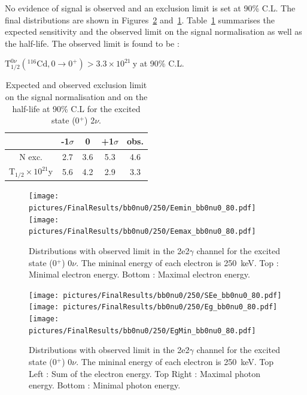 \documentclass[main.tex]{subfiles}
\begin{document}
\NI No evidence of signal is observed and an exclusion limit is set at 90\% C.L. The final distributions are shown in Figures~\ref{plot:SEeAndEg250bb0nu0} and~\ref{plot:EeminAndEemax250bb0nu0}. Table~\ref{Tab:FinalResultsbb0nu0} summarises the expected sensitivity and the observed limit on the signal normalisation as well as the half-life. The observed limit is found to be :

\begin{center}
$ \text{T}_{\text{1/2}}^{\text{0}\nu} (^{\text{116}} \text{Cd}, \text{0} \rightarrow \text{0}^{+}) > \text{3.3} \times \text{10}^{\text{21}}~\text{y}$ at 90\% C.L.
\end{center}


\begin{table}
\centering
\begin{tabular}{c|c|c|c||c}
                                                & -1$\sigma$ & 0        & +1$\sigma$ & obs.     \\[0.2cm]
\hline
N exc.                                          & 2.7        & 3.6      & 5.3        & 4.6     \\[0.2cm]
T$_{\text{1/2}} \times \text{10}^{\text{21}}$y  & 5.6        & 4.2      & 2.9        & 3.3      \\[0.2cm]
\hline
\end{tabular}
\caption{Expected and observed exclusion limit on the signal normalisation and on the half-life at 90\% C.L for the excited state (0$^+$) 2$\nu$.}
\label{Tab:FinalResultsbb0nu0}
\end{table}


\begin{figure} [h!]
\begin{center}
\texttt{[image: pictures/FinalResults/bb0nu0/250/Eemin\_bb0nu0\_80.pdf]}
\texttt{[image: pictures/FinalResults/bb0nu0/250/Eemax\_bb0nu0\_80.pdf]}
\end{center}
\caption{Distributions with observed limit in the 2e2$\gamma$ channel for the excited state (0$^+$) 0$\nu$. The mininal energy of each electron is 250~keV. Top : Minimal electron energy. Bottom : Maximal electron energy.}
\label{plot:EeminAndEemax250bb0nu0}
\end{figure}


\begin{figure} [h!]
\begin{center}
\texttt{[image: pictures/FinalResults/bb0nu0/250/SEe\_bb0nu0\_80.pdf]}
\texttt{[image: pictures/FinalResults/bb0nu0/250/Eg\_bb0nu0\_80.pdf]}
\texttt{[image: pictures/FinalResults/bb0nu0/250/EgMin\_bb0nu0\_80.pdf]}
\end{center}
\caption{Distributions with observed limit in the 2e2$\gamma$ channel for the excited state (0$^+$) 0$\nu$. The mininal energy of each electron is 250~keV. Top Left : Sum of the electron energy. Top Right : Maximal photon energy. Bottom : Minimal photon energy.}
\label{plot:SEeAndEg250bb0nu0}
\end{figure}
\end{document}
